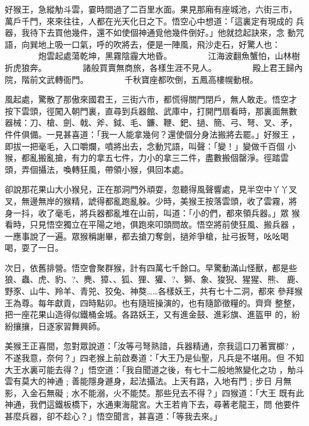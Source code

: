 \begin{pinyinscope}
{好猴王，急縱觔斗雲，霎時間過了二百里水面。果見那廂有座城池，六街三市，
萬戶千門，來來往往，人都在光天化日之下。悟空心中想道：「這裏定有現成的
兵器，我待下去買他幾件，還不如使個神通覓他幾件倒好。」他就捻起訣來，念
動咒語，向巽地上吸一口氣，呼的吹將去，便是一陣風，飛沙走石，好驚人也：
　　　　炮雲起處蕩乾坤，黑霧陰霾大地昏。
　　　　江海波翻魚蟹怕，山林樹折虎狼奔。
　　　　諸般買賣無商旅，各樣生涯不見人。
　　　　殿上君王歸內院，階前文武轉衙門。
　　　　千秋寶座都吹倒，五鳳高樓幌動根。

風起處，驚散了那傲來國君王，三街六巿，都慌得關門閉戶，無人敢走。悟空才
按下雲頭，徑闖入朝門裏，直尋到兵器館、武庫中，打開門扇看時，那裏面無數
器械：刀、槍、劍、戟、斧、鉞、毛、鐮、鞭、鈀、撾、簡、弓、弩、叉、矛，
件件俱備。一見甚喜道：「我一人能拿幾何？還使個分身法搬將去罷。」好猴王
，即拔一把毫毛，入口嚼爛，噴將出去，念動咒語，叫聲：「變！」變做千百個
小猴，都亂搬亂搶，有力的拿五七件，力小的拿三二件，盡數搬個罄淨。徑踏雲
頭，弄個攝法，喚轉狂風，帶領小猴，俱回本處。

卻說那花果山大小猴兒，正在那洞門外頑耍，忽聽得風聲響處，見半空中丫丫叉
叉，無邊無岸的猴精，諕得都亂跑亂躲。少時，美猴王按落雲頭，收了雲霧，將
身一抖，收了毫毛，將兵器都亂堆在山前，叫道：「小的們，都來領兵器。」眾
猴看時，只見悟空獨立在平陽之地，俱跑來叩頭問故。悟空將前使狂風、搬兵器
，一應事說了一遍。眾猴稱謝畢，都去搶刀奪劍，撾斧爭槍，扯弓扳弩，吆吆喝
喝，耍了一日。

次日，依舊排營。悟空會聚群猴，計有四萬七千餘口。早驚動滿山怪獸，都是些
狼、蟲、虎、豹、?、麂、獐、、狐、狸、獾、?、獅、象、狻猊、猩猩、熊、
鹿、野豕、山牛、羚羊、青兕、狡兔、神獒……各樣妖王，共有七十二洞，都來
參拜猴王為尊。每年獻貢，四時點卯。也有隨班操演的，也有隨節徵糧的。齊齊
整整，把一座花果山造得似鐵桶金城。各路妖王，又有進金鼓、進彩旗、進盔甲
的，紛紛攘攘，日逐家習舞興師。

美猴王正喜間，忽對眾說道：「汝等弓弩熟諳，兵器精通，奈我這口刀著實榔?
，不遂我意，奈何？」四老猴上前啟奏道：「大王乃是仙聖，凡兵是不堪用。但
不知大王水裏可能去得？」悟空道：「我自聞道之後，有七十二般地煞變化之功
，觔斗雲有莫大的神通﹔善能隱身遯身，起法攝法。上天有路，入地有門﹔步日
月無影，入金石無礙﹔水不能溺，火不能焚。那些兒去不得？」四猴道：「大王
既有此神通，我們這鐵板橋下，水通東海龍宮。大王若肯下去，尋著老龍王，問
他要件甚麼兵器，卻不趁心？」悟空聞言，甚喜道：「等我去來。」

}
\end{pinyinscope}
